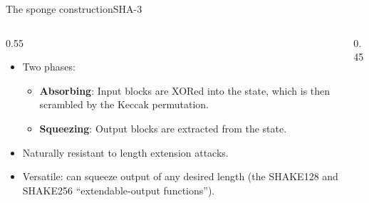 \ifdefined\PRESENTATION\else\PassOptionsToClass{handout}{beamer}\fi\documentclass[aspectratio=169, lualatex]{beamer}
\begin{document}
\begin{frame}{The sponge construction}{SHA-3}
	\begin{columns}[c]
		\begin{column}{0.55\textwidth}
			\begin{itemize}
				\item Two phases:
				      \begin{itemize}
					      \item \textbf{Absorbing}: Input blocks are XORed into the state, which is then scrambled by the Keccak permutation.
					      \item \textbf{Squeezing}: Output blocks are extracted from the state.
				      \end{itemize}
				\item Naturally resistant to length extension attacks.
				\item Versatile: can squeeze output of any desired length (the SHAKE128 and SHAKE256 ``extendable-output functions'').
			\end{itemize}
		\end{column}
		\begin{column}{0.45\textwidth}
		\end{column}
	\end{columns}
\end{frame}
\end{document}

